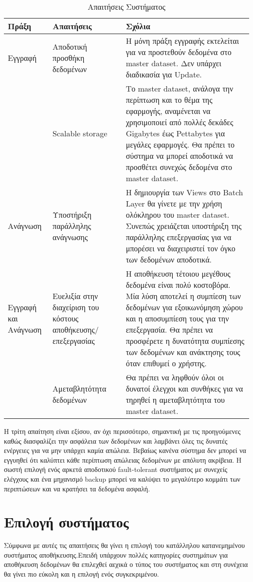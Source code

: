 \begin{table}[!htb]
\centering
\caption{Απαιτήσεις Συστήματος}
\label{my-label}
\begin{tabular}{|M{2.5cm}|p{5cm}|p{8cm}|}
\hline
{} 
                 Πράξη  & Απαιτήσεις & Σχόλια \\ \hline
                 Εγγραφή & Αποδοτική προσθήκη δεδομένων & Η μόνη πράξη εγγραφής εκτελείται για να προστεθούν δεδομένα στο master dataset. Δεν υπάρχει διαδικασία για Update. \\  
                   & Scalable storage & Το master dataset, ανάλογα την περίπτωση και το θέμα της εφαρμογής, αναμένεται  να χρησιμοποιεί από πολλές δεκάδες Gigabytes έως Pettabytes για μεγάλες εφαρμογές. Θα πρέπει το σύστημα να μπορεί αποδοτικά να προσθέτει συνεχώς δεδομένα στο master dataset. \\ \hline
                 Ανάγνωση  & Υποστήριξη παράλληλης ανάγνωσης &  Η δημιουργία των Views στο Batch Layer θα γίνετε με την χρήση ολόκληρου του master dataset. Συνεπώς χρειάζεται υποστήριξη της παράλληλης επεξεργασίας για να μπορέσει να διαχειριστεί τον όγκο των δεδομένων αποδοτικά.\\ \hline
                 Εγγραφή και Ανάγνωση  & Ευελιξία στην διαχείριση του κόστους αποθήκευσης/επεξεργασίας & Η αποθήκευση τέτοιου μεγέθους δεδομένα είναι πολύ κοστοβόρα. Μία λύση αποτελεί η συμπίεση των δεδομένων για εξοικωνόμηση χώρου και η αποσυμπίεση τους για την επεξεργασία. Θα πρέπει να προσφέρετε η δυνατότητα συμπίεσης των δεδομένων και ανάκτησης τους όταν επιθυμεί ο χρήστης. \\  
 & Αμεταβλητότητα δεδομένων & Θα πρέπει να ληφθούν όλοι οι δυνατοί έλεγχοι και συνθήκες για να τηρηθεί η αμεταβλητότητα του master dataset. \\ \hline
\end{tabular}
\end{table}
\clearpage

H τρίτη απαίτηση είναι εξίσου, αν όχι περισσότερο, σημαντική με τις προηγούμενες καθώς διασφαλίζει την ασφάλεια των δεδομένων και λαμβάνει όλες τις δυνατές ενέργειες για να μην υπάρχει καμία απώλεια. Βεβαίως κανένα σύστημα δεν μπορεί να εγγυηθεί ότι καλύπτει κάθε περίπτωση απώλειας δεδομένων με απόλυτη ακρίβεια. Η σωστή επιλογή ενός αρκετά αποδοτικού fault-tolerant συστήματος με συνεχείς ελέγχους και ένα μηχανισμό backup μπορεί να καλύψει το μεγαλύτερο κομμάτι των περιπτώσεων και να κρατήσει τα δεδομένα ασφαλή.


\section{Επιλογή συστήματος}
Σύμφωνα με αυτές τις απαιτήσεις θα γίνει η επιλογή του κατάλληλου κατανεμημένου συστήματος αποθήκευσης.Επειδή υπάρχουν πολλές κατηγορίες συστημάτων για αποθήκευση δεδομένων θα επιλεχθεί αεχικά ο τύπος του συστήματος και στη συνέχεια θα γίνει πιο εύκολη και η επιλογή ενός συγκεκριμένου.

